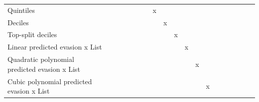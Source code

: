 \begin{tabular}{lcccccccccccccccccc}
Quintiles   &                     &                     &                     &                     &                     &                     &           x         &                     &                     &                     &                     &                     &                     &                     &                     &                     &                     &                     \\
Deciles     &                     &                     &                     &                     &                     &                     &                     &           x         &                     &                     &                     &                     &                     &                     &                     &                     &                     &                     \\
Top-split deciles&                     &                     &                     &                     &                     &                     &                     &                     &           x         &                     &                     &                     &                     &                     &                     &                     &                     &                     \\
Linear predicted evasion x List&                     &                     &                     &                     &                     &                     &                     &                     &                     &           x         &                     &                     &                     &                     &                     &                     &                     &                     \\
Quadratic polynomial predicted evasion x List&                     &                     &                     &                     &                     &                     &                     &                     &                     &                     &           x         &                     &                     &                     &                     &                     &                     &                     \\
Cubic polynomial predicted evasion x List&                     &                     &                     &                     &                     &                     &                     &                     &                     &                     &                     &           x         &                     &                     &                     &                     &                     &                     \\

\end{tabular}
